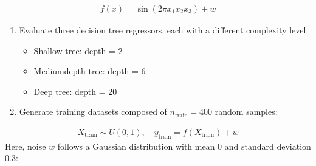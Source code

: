 \documentclass[letterpaper,10pt,english]{jupyterBook}
\begin{document}
\begin{equation*}
\begin{split}f(x) = \sin(2\pi x_1 x_2 x_3) + w\end{split}
\end{equation*}\begin{enumerate}
%
\setcounter{enumi}{1}
\item {} 
\sphinxAtStartPar
Evaluate three decision tree regressors, each with a different complexity level:
\begin{itemize}
\item {} 
\sphinxAtStartPar
Shallow tree: depth = 2

\item {} 
\sphinxAtStartPar
Medium\sphinxhyphen{}depth tree: depth = 6

\item {} 
\sphinxAtStartPar
Deep tree: depth = 20

\end{itemize}

\item {} 
\sphinxAtStartPar
Generate training datasets composed of \(n_{\text{train}} = 400\) random samples:

\end{enumerate}
\begin{equation*}
\begin{split}
X_{\text{train}} \sim U(0,1), \quad y_{\text{train}} = f(X_{\text{train}}) + w
\end{split}
\end{equation*}
\sphinxAtStartPar
Here, noise \(w\) follows a Gaussian distribution with mean 0 and standard deviation \(0.3\):
\end{document}
